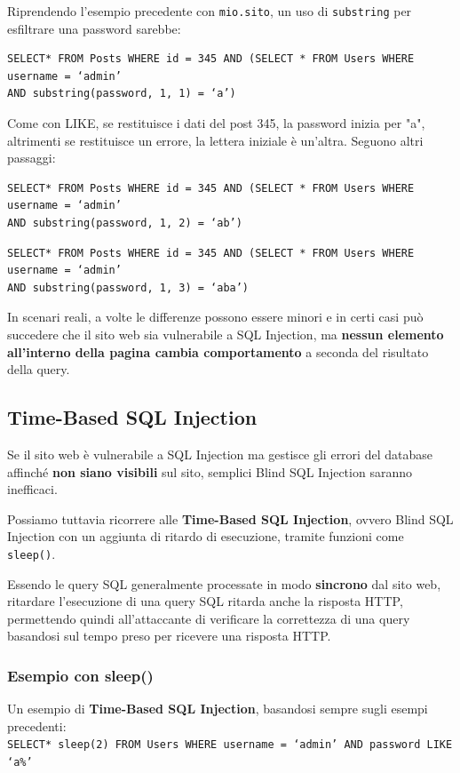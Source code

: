 \documentclass{article}
\begin{document}
Riprendendo l'esempio precedente con \verb|mio.sito|, un uso di \verb|substring| per esfiltrare una password sarebbe:
\begin{verbatim}
SELECT* FROM Posts WHERE id = 345 AND (SELECT * FROM Users WHERE username = ‘admin’ 
AND substring(password, 1, 1) = ‘a’)
\end{verbatim}

Come con LIKE, se restituisce i dati del post 345, la password inizia per "a", altrimenti se restituisce un errore, la lettera iniziale è un'altra. Seguono altri passaggi:

\begin{verbatim}
SELECT* FROM Posts WHERE id = 345 AND (SELECT * FROM Users WHERE username = ‘admin’ 
AND substring(password, 1, 2) = ‘ab’)
\end{verbatim}

\begin{verbatim}
SELECT* FROM Posts WHERE id = 345 AND (SELECT * FROM Users WHERE username = ‘admin’ 
AND substring(password, 1, 3) = ‘aba’)
\end{verbatim}

In scenari reali, a volte le differenze possono essere minori e in certi casi può succedere che il sito web sia vulnerabile a SQL Injection, ma \textbf{nessun elemento all'interno della pagina cambia comportamento} a seconda del risultato della query. 

\subsection{Time-Based SQL Injection}
Se il sito web è vulnerabile a SQL Injection ma gestisce gli errori del database affinché \textbf{non siano visibili} sul sito, semplici Blind SQL Injection saranno inefficaci.

Possiamo tuttavia ricorrere alle \textbf{Time-Based SQL Injection}, ovvero Blind SQL Injection con un aggiunta di ritardo di esecuzione, tramite funzioni come \verb|sleep()|.

Essendo le query SQL generalmente processate in modo \textbf{sincrono} dal sito web, ritardare l'esecuzione di una query SQL ritarda anche la risposta HTTP, permettendo quindi all'attaccante di verificare la correttezza di una query basandosi sul tempo preso per ricevere una risposta HTTP.

\subsubsection{Esempio con sleep()}
Un esempio di \textbf{Time-Based SQL Injection}, basandosi sempre sugli esempi precedenti:\\
\verb|SELECT* sleep(2) FROM Users WHERE username = ‘admin’ AND password LIKE ‘a%’|
\end{document}
